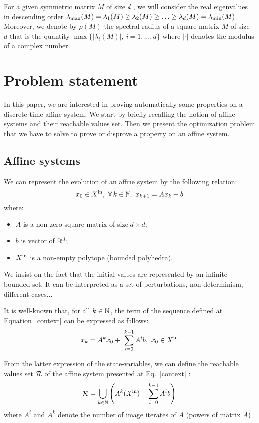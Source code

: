 \documentclass[10pt]{article}
\begin{document}
For a given symmetric matrix $M$ of size $d$ , we will consider the real eigenvalues in descending order   $\lambda_{\operatorname{max}}(M)=\lambda_1(M)\geq \lambda_2(M)\geq \ldots\geq \lambda_d(M)=\lambda_{\operatorname{min}}(M)$. Moreover, we denote by $\rho(M)$ the spectral radius of a square matrix $M$ of size $d$ that is the quantity $\max\{|\lambda_i(M)|,\ i=1,\ldots,d\}$ where $|\cdot|$ denotes the modulus of a complex number.

\section{Problem statement}
In this paper, we are interested in proving automatically some properties on a discrete-time affine system. We start by briefly recalling the notion of affine systems and their reachable values set. Then we present the optimization problem that we have to solve to prove or disprove a property on an affine system.

\subsection{Affine systems}

We can represent the evolution of an affine system by the following relation:
\begin{equation}
\label{context}
x_0\in X^\mathrm{in},\ \forall\, k\in\mathbb{N},\ x_{k+1}=A x_k + b  
\end{equation}
where:
\begin{itemize}
\item $A$ is a non-zero square matrix of size $d\times d$;
\item $b$ is vector of $\mathbb R^d$;
\item  $X^\mathrm{in}$ is a non-empty polytope (bounded polyhedra). 
\end{itemize}
We insist on the fact that the initial values are represented by an infinite bounded set. It can be interpreted as a set of perturbations, non-determinism, different cases...

It is well-known that, for all $k\in\mathbb{N}$, the term of the sequence defined at Equation~\eqref{context} can be expressed as follows:
\[
x_k=A^k x_0+ \sum_{i=0}^{k-1} A^i b,\ x_0\in\xin
\]

From the latter expression of the state-variables, we can define the reachable values set $\mathcal{R}$ of the affine system presented at Eq.~\eqref{context} :
\begin{equation}
\label{reach}
\mathcal{R}=\bigcup_{k\in \mathbb{N}} \left(A^{k}(X^\mathrm{in})+\sum_{i=0}^{k-1} A^i b\right)
\end{equation}
where $A^i$ and $A^k$ denote the number of image iterates of $A$ (powers of matrix $A$) . 
\end{document}
